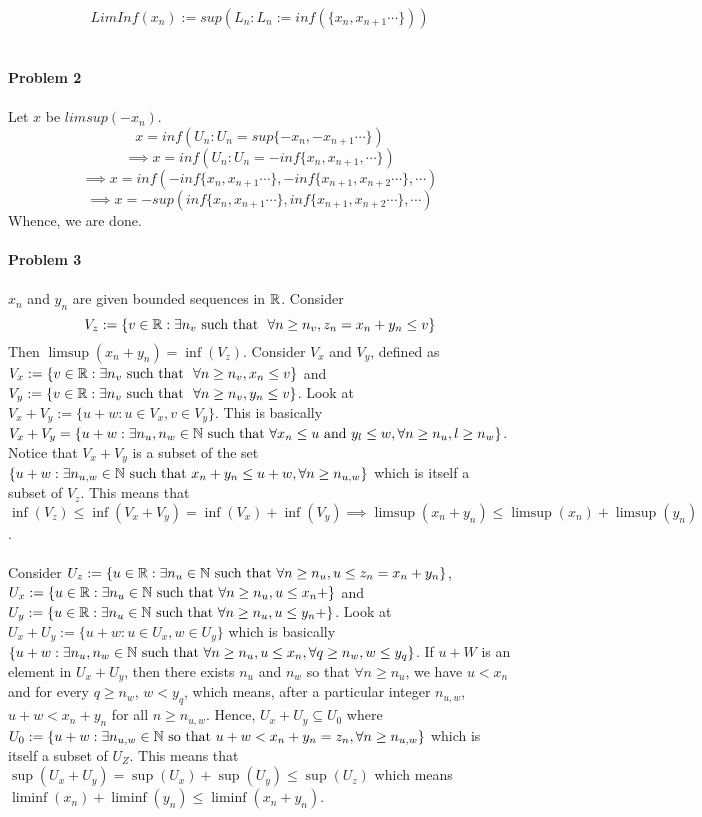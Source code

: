 \documentclass[../Main.tex]{subfiles}
\begin{document}
$$LimInf(x_n):=sup(L_n: L_n:=inf(\{x_n,x_{n+1} \cdots \})) $$
\\\\ \textbf{Problem 2}
\\\\ Let $x$ be $limsup(-x_n)$. $$x=inf(U_n: U_n=sup\{-x_n,-x_{n+1} \cdots \})$$
$$\implies x=inf(U_n:U_n=-inf\{x_n,x_{n+1},\cdots\})$$
$$\implies x=inf(-inf\{x_n,x_{n+1}\cdots \}, -inf\{x_{n+1},x_{n+2}\cdots \},\cdots)$$ 
$$\implies x=-sup(inf\{x_n,x_{n+1}\cdots \},inf\{x_{n+1},x_{n+2}\cdots \},\cdots) $$
Whence, we are done.
\\\\ \textbf{Problem 3}
\\\\ $x_n$ and $y_n$ are given bounded sequences in $\mathbb R$. 
Consider $$V_z:=\{v \in \mathbb R: \exists n_v \text{ such that } \ \forall n \geq n_v, z_n=x_n+y_n \leq v\}$$
Then $\limsup(x_n+y_n)=\inf(V_z)$. Consider $V_x$ and $V_y$, defined as $V_x:=\{v \in \mathbb R: \exists n_v \text{ such that } \ \forall n \geq n_v, x_n \leq v\}$ and $V_y:=\{v \in \RR: \exists n_v \text{ such that } \ \forall n \geq n_v, y_n \leq v\}$. Look at $V_x+V_y:=\{u+w: u \in V_x, v \in V_y \}$. This is basically $V_x+V_y=\{u+w: \exists n_u, n_w \in \mathbb N \text{ such that } \forall x_n \leq u \text{ and } y_l \leq w, \forall n \geq n_u, l \geq n_w \}$. Notice that $V_x+V_y$ is a subset of the set $\{u+w: \exists n_{u,w} \in \mathbb N \text{ such that }x_n+y_n \leq u+w, \forall n \geq n_{u,w}\}$ which is itself a subset of $V_z$. This means that $\inf(V_z) \leq \inf(V_x+V_y)=\inf(V_x)+\inf(V_y) \implies \limsup(x_n+y_n) \leq \limsup(x_n)+\limsup(y_n)$. 
\\\\ Consider $U_z:=\{u \in \mathbb R: \exists n_u \in \mathbb N \text{ such that } \forall n \geq n_u, u \leq z_n=x_n+y_n\}$,
$U_x:=\{u \in \mathbb R: \exists n_u \in \mathbb N \text{ such that } \forall n \geq n_u, u \leq x_n+\}$ and $U_y:=\{u \in \mathbb R: \exists n_u \in \mathbb N \text{ such that } \forall n \geq n_u, u \leq y_n+\}$. Look at $U_x+U_y:=\{u+w: u \in U_x, w \in U_y\}$ which is basically $\{u+w: \exists n_u, n_w \in \mathbb N \text{ such that } \forall n \geq n_u, u \leq x_n, \forall q \geq n_w, w \leq y_q\}$. If $u+W$ is an element in $U_x+U_y$, then there exists $n_u$ and $n_w$ so that $\forall n \geq n_u$, we have $u<x_n$ and for every $q \geq n_w$, $w<y_q$, which means, after a particular integer $n_{u,w}$, $u+w<x_n+y_n$ for all $n \geq n_{u,w}$. Hence, $U_x+U_y \subseteq U_0$ where $U_0:=\{u+w: \exists n_{u,w} \in \mathbb N \text{ so that } u+w<x_n+y_n=z_n, \forall n \geq n_{u,w}\}$ which is itself a subset of $U_Z$. This means that $\sup(U_x+U_y)=\sup(U_x)+\sup(U_y) \leq \sup(U_z)$ which means $\liminf(x_n)+\liminf(y_n) \leq \liminf(x_n+y_n)$.
\end{document}
